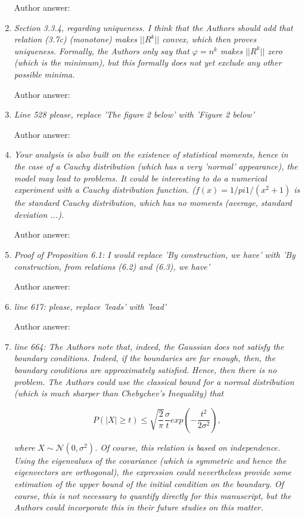 \documentclass[a4paper,11pt]{scrartcl}
\let\phi\varphi
\begin{document}
\begin{enumerate}
Author answer:

\item
\textit{Section 3.3.4, regarding uniqueness. I think that the Authors should add that relation (3.7c) (monotone) makes $||R^k||$ convex, which then proves uniqueness. Formally, the Authors only say that $\phi = n^k$ makes $||R^k||$ zero (which is the minimum), but this formally does not yet exclude any other possible minima.}

Author answer:

\item
\textit{Line 528 please, replace 'The figure 2 below' with 'Figure 2 below'}

Author answer:

\item
\textit{Your analysis is also built on the existence of statistical moments, hence in the case of a Cauchy distribution (which has a very 'normal' appearance), the model may lead to problems. It could be interesting to do a numerical experiment with a Cauchy distribution function. ($f(x) = 1/pi 1 / (x^2 + 1)$ is the standard Cauchy distribution, which has no moments (average, standard deviation ...).}

Author answer:

\item
\textit{Proof of Proposition 6.1: I would replace 'By construction, we have' with 'By construction, from relations (6.2) and (6.3), we have'}

Author answer:

\item
\textit{line 617: please, replace 'leads' with 'lead'}

Author answer:

\item
\textit{line 664: The Authors note that, indeed, the Gaussian does not satisfy the boundary conditions. Indeed, if the boundaries are far enough, then, the boundary conditions are approximately satisfied. Hence, then there is no problem. The Authors could use the classical bound for a normal distribution (which is much sharper than Chebychev's Inequality) that}

$$P(|X| \ge t ) \le \sqrt{\frac{2}{\pi}} \frac{\sigma}{t} exp(-\frac{t^2}{2 \sigma^2}),$$

\textit{where $X \sim \mathcal{N}(0,\sigma^2)$. Of course, this relation is based on independence. Using the eigenvalues of the covariance (which is symmetric and hence the eigenvectors are orthogonal), the expression could nevertheless provide some estimation of the upper bound of the initial condition on the boundary.
Of course, this is not necessary to quantify directly for this manuscript, but the Authors could incorporate this in their future studies on this matter.}


\end{enumerate}
\end{document}
